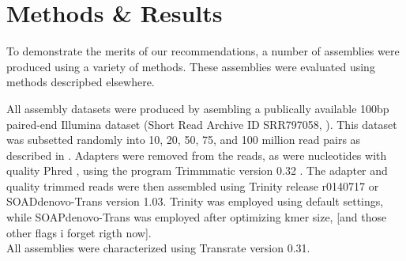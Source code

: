 \section*{Methods & Results}

To demonstrate the merits of our recommendations, a number of assemblies were produced using a variety of methods. These assemblies were evaluated using methods descripbed elsewhere. 

All assembly datasets were produced by asembling a publically available 100bp paired-end Illumina dataset (Short Read Archive ID SRR797058, \citep{Macfarlan:2012js}). This dataset was subsetted randomly into 10, 20, 50, 75, and 100 million read pairs as described in \citep{MacManes:2014io}. Adapters were removed from the reads, as were nucleotides with quality Phred , using the program Trimmmatic version 0.32 \citep{Bolger:2014ek}. The adapter and quality trimmed reads were then assembled using Trinity release r0140717 or SOADdenovo-Trans version 1.03. Trinity was employed using default settings, while SOAPdenovo-Trans was employed after optimizing kmer size, [and those other flags i forget rigth now]. \\

All assemblies were characterized using Transrate version 0.31. 